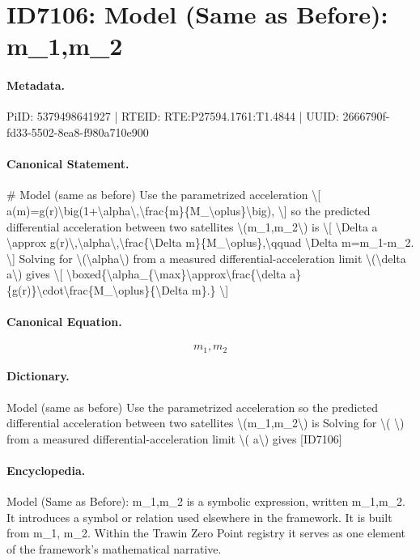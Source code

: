\section*{ID7106: Model (Same as Before): m\_1,m\_2}
\paragraph{Metadata.}
PiID: 5379498641927 | RTEID: RTE:P27594.1761:T1.4844 | UUID: 2666790f-fd33-5502-8ea8-f980a710e900

\paragraph{Canonical Statement.}
\# Model (same as before) Use the parametrized acceleration \textbackslash{}[ a(m)=g(r)\textbackslash{}big(1+\textbackslash{}alpha\textbackslash{},\textbackslash{}frac\{m\}\{M\_\textbackslash{}oplus\}\textbackslash{}big), \textbackslash{}] so the predicted differential acceleration between two satellites \textbackslash{}(m\_1,m\_2\textbackslash{}) is \textbackslash{}[ \textbackslash{}Delta a \textbackslash{}approx g(r)\textbackslash{},\textbackslash{}alpha\textbackslash{},\textbackslash{}frac\{\textbackslash{}Delta m\}\{M\_\textbackslash{}oplus\},\textbackslash{}qquad \textbackslash{}Delta m=m\_1-m\_2. \textbackslash{}] Solving for \textbackslash{}(\textbackslash{}alpha\textbackslash{}) from a measured differential-acceleration limit \textbackslash{}(\textbackslash{}delta a\textbackslash{}) gives \textbackslash{}[ \textbackslash{}boxed\{\textbackslash{}alpha\_\{\textbackslash{}max\}\textbackslash{}approx\textbackslash{}frac\{\textbackslash{}delta a\}\{g(r)\}\textbackslash{}cdot\textbackslash{}frac\{M\_\textbackslash{}oplus\}\{\textbackslash{}Delta m\}.\} \textbackslash{}]

\paragraph{Canonical Equation.}
\[
m_1,m_2
\]

\paragraph{Dictionary.}
Model (same as before) Use the parametrized acceleration so the predicted differential acceleration between two satellites \textbackslash{}(m\_1,m\_2\textbackslash{}) is Solving for \textbackslash{}( \textbackslash{}) from a measured differential-acceleration limit \textbackslash{}( a\textbackslash{}) gives [ID7106]

\paragraph{Encyclopedia.}
Model (Same as Before): m\_1,m\_2 is a symbolic expression, written m\_1,m\_2. It introduces a symbol or relation used elsewhere in the framework. It is built from m\_1, m\_2. Within the Trawin Zero Point registry it serves as one element of the framework's mathematical narrative.

